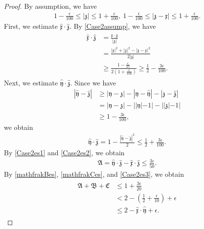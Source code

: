 \documentclass[10pt,a4paper]{amsart}
\numberwithin{equation}{section}
\begin{document}
\begin{proof}
By assumption, we have
\begin{align}\label{Case2assump}
1-\frac{\epsilon}{100}\leq |\mathfrak{z}|\leq 1+\frac{\epsilon}{100},\ 1-\frac{\epsilon}{100}\leq |\mathfrak{z}-\mathfrak{x}|\leq 1+\frac{\epsilon}{100}.
\end{align}
First, we estimate $\hat{\mathfrak{x}}\cdot \hat{\mathfrak{z}}$. By \eqref{Case2assump}, we have
\begin{align}\label{Case2es1}
\begin{aligned}
\hat{\mathfrak{x}}\cdot \hat{\mathfrak{z}}&=\frac{ \mathfrak{x}\cdot \mathfrak{z}}{|\mathfrak{z}|}
\\
&=\frac{|\mathfrak{x}|^2+|\mathfrak{z}|^2-|\mathfrak{z}-\mathfrak{x}|^2}{2|\mathfrak{z}|}
\\
&\geq \frac{1-\frac{\epsilon}{25}}{2(1+\frac{\epsilon}{100})}\geq \frac{1}{2}-\frac{3\epsilon}{100}.
\end{aligned}
\end{align}
Next, we estimate $\hat{\mathfrak{y}}\cdot \hat{\mathfrak{z}}$. Since we have
\begin{align*}
|\hat{\mathfrak{y}}-\hat{\mathfrak{z}}|&\geq |\mathfrak{y}-\mathfrak{z}|-|\mathfrak{y}-\hat{\mathfrak{y}}|-|\mathfrak{z}-\hat{\mathfrak{z}}|
\\
&=|\mathfrak{y}-\mathfrak{z}|-||\mathfrak{y}|-1|-||\mathfrak{z}|-1|
\\
&\geq 1-\frac{3\epsilon}{100},
\end{align*}
we obtain 
\begin{align}\label{Case2es2}
\hat{\mathfrak{y}}\cdot \hat{\mathfrak{z}}=1-\frac{|\hat{\mathfrak{y}}-\hat{\mathfrak{z}}|^2}{2}\leq \frac{1}{2}+\frac{3\epsilon}{100}.
\end{align}
By \eqref{Case2es1} and \eqref{Case2es2}, we obtain
\begin{align}\label{Case2es3}
\mathfrak{A}=\hat{\mathfrak{y}}\cdot \hat{\mathfrak{z}}-\hat{\mathfrak{x}}\cdot \hat{\mathfrak{z}}\leq \frac{3\epsilon}{50}.
\end{align}
By \eqref{mathfrakBes}, \eqref{mathfrakCes}, and \eqref{Case2es3}, we obtain
\begin{align}\label{mathfrakCase2}
\begin{aligned}
\mathfrak{A}+\mathfrak{B}+\mathfrak{C}&\leq 1+\frac{3\epsilon}{20}
\\
&< 2-\left(\frac{1}{2}+\frac{\epsilon}{10}\right)+\epsilon
\\
&\leq 2-\hat{\mathfrak{x}}\cdot \hat{\mathfrak{y}}+\epsilon.
\end{aligned}
\end{align}


\end{proof}
\end{document}
